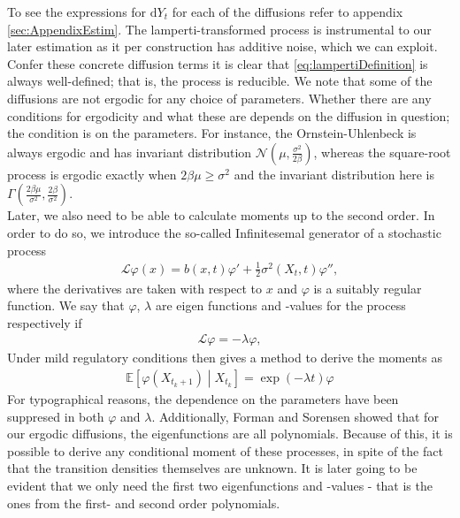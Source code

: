 To see the expressions for $\mathrm{d}Y_t$ for each of the diffusions refer to appendix \ref{sec:AppendixEstim}. The lamperti-transformed process is instrumental to our later estimation as it per construction has additive noise, which we can exploit. Confer these concrete diffusion terms it is clear that \ref{eq:lampertiDefinition} is always well-defined; that is, the process is reducible.  We note that some of the diffusions are not ergodic for any choice of parameters. Whether there are any conditions for ergodicity and what these are depends on the diffusion in question; the condition is on the parameters. For instance, the Ornstein-Uhlenbeck is always ergodic and has invariant distribution $\mathcal{N}\left(\mu, \frac{\sigma^2}{2\beta}\right)$, whereas the square-root process is ergodic exactly when $2\beta\mu\geq \sigma^2$ and the invariant distribution here is $\Gamma\left(\frac{2\beta\mu}{\sigma^2}, \frac{2\beta}{\sigma^2}\right)$. \\

Later, we also need to be able to calculate moments up to the second order. In order to do so, we introduce the so-called Infinitesemal generator of a stochastic process
\begin{align}
    \mathcal{L}\varphi(x) = b(x, t) \varphi' + \frac{1}{2}\sigma^2(X_t, t)\varphi'',
\end{align}
where the derivatives are taken with respect to $x$ and $\varphi$ is a suitably regular function. We say that $\varphi$, $\lambda$ are eigen functions and -values for the process respectively if
\begin{align}
    \mathcal{L}\varphi = - \lambda \varphi,
\end{align}
Under mild regulatory conditions \cite[theorem 1.16]{StatisticalMethodsForSDE} then gives a method to derive the moments as
\begin{align}
    \mathbb{E}\left[\varphi(X_{t_k + 1}) \middle | X_{t_k}\right] = \exp\left(-\lambda t\right)\varphi \label{eq:momentConditions}
\end{align}
For typographical reasons, the dependence on the parameters have been suppresed in both $\varphi$ and $\lambda$. Additionally, Forman and Sorensen \cite{FormanSorensen2008} showed that for our ergodic diffusions, the eigenfunctions are all polynomials. Because of this, it is possible to derive any conditional moment of these processes, in spite of the fact that  the transition densities themselves are unknown. It is later going to be evident that we only need the first two eigenfunctions and -values - that is the ones from the first- and second order polynomials.
